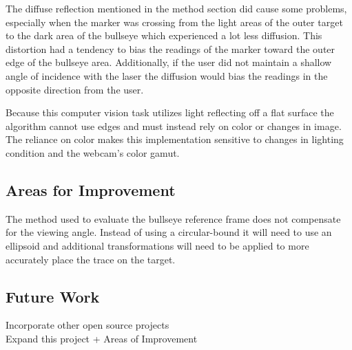\documentclass[conference]{IEEEtran}
\begin{document}
The diffuse reflection mentioned in the method section did cause some problems, especially when the marker was crossing from the light areas of the outer target to the dark area of the bullseye which experienced a lot less diffusion.
This distortion had a tendency to bias the readings of the marker toward the outer edge of the bullseye area.
Additionally, if the user did not maintain a shallow angle of incidence with the laser the diffusion would bias the readings in the opposite direction from the user.

Because this computer vision task utilizes light reflecting off a flat surface the algorithm cannot use edges and must instead rely on color or changes in image.
The reliance on color makes this implementation sensitive to changes in lighting condition and the webcam's color gamut.

\subsection{Areas for Improvement}

The method used to evaluate the bullseye reference frame does not compensate for the viewing angle. Instead of using a circular-bound it will need to use an ellipsoid and additional transformations will need to be applied to more accurately place the trace on the target.

\subsection{Future Work}

\noindent
\textlangle Incorporate other open source projects \textrangle \\
\textlangle Expand this project + Areas of Improvement \textrangle

\clearpage


\end{document}
